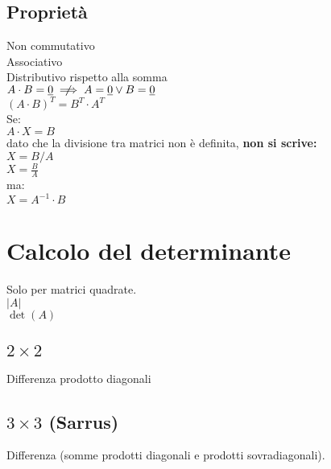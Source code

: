 \documentclass[a4paper, twoside, italian, 11pt]{book}
\newcommand{\detm}[1] {\left | #1 \right |}
\begin{document}
\subsection{Proprietà}

Non commutativo \\
Associativo \\
Distributivo rispetto alla somma \\

\noindent
$A \cdot B = \underline{0} \centernot\implies A = \underline{0} \lor B = \underline{0}$ \\

\noindent
$(A \cdot B)^T = B^T \cdot A^T$ \\

\noindent
Se: \\

$A \cdot X = B$ \\

\noindent
dato che la divisione tra matrici non è definita, \textbf{non si scrive:} \\

$X = B / A$ \\
\indent
$X = \frac{B}{A}$ \\

\noindent
ma: \\

$X = A^{-1} \cdot B$



\section{Calcolo del determinante}

Solo per matrici quadrate. \\

\noindent
$\detm A$ \\

\noindent
$\det(A)$



\subsection{$2 \times 2$}

Differenza prodotto diagonali


\subsection{$3 \times 3$ (Sarrus)}

Differenza (somme prodotti diagonali e prodotti sovradiagonali). \\
\end{document}
